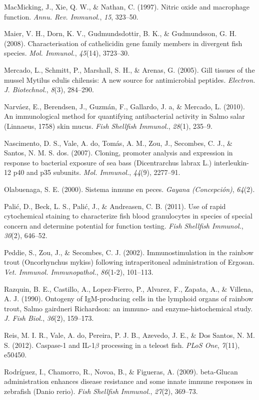 \documentclass[12pt,a4paper,]{article}
\begin{document}
MacMicking, J., Xie, Q. W., \& Nathan, C. (1997). Nitric oxide and
macrophage function. \emph{Annu. Rev. Immunol.}, \emph{15}, 323--50.

Maier, V. H., Dorn, K. V., Gudmundsdottir, B. K., \& Gudmundsson, G. H.
(2008). Characterisation of cathelicidin gene family members in
divergent fish species. \emph{Mol. Immunol.}, \emph{45}(14), 3723--30.

Mercado, L., Schmitt, P., Marshall, S. H., \& Arenas, G. (2005). Gill
tissues of the mussel Mytilus edulis chilensis: A new source for
antimicrobial peptides. \emph{Electron. J. Biotechnol.}, \emph{8}(3),
284--290.

Narváez, E., Berendsen, J., Guzmán, F., Gallardo, J. a, \& Mercado, L.
(2010). An immunological method for quantifying antibacterial activity
in Salmo salar (Linnaeus, 1758) skin mucus. \emph{Fish Shellfish
Immunol.}, \emph{28}(1), 235--9.

Nascimento, D. S., Vale, A. do, Tomás, A. M., Zou, J., Secombes, C. J.,
\& Santos, N. M. S. dos. (2007). Cloning, promoter analysis and
expression in response to bacterial exposure of sea bass (Dicentrarchus
labrax L.) interleukin-12 p40 and p35 subunits. \emph{Mol. Immunol.},
\emph{44}(9), 2277--91.

Olabuenaga, S. E. (2000). Sistema inmune en peces. \emph{Gayana
(Concepción)}, \emph{64}(2).

Palić, D., Beck, L. S., Palić, J., \& Andreasen, C. B. (2011). Use of
rapid cytochemical staining to characterize fish blood granulocytes in
species of special concern and determine potential for function testing.
\emph{Fish Shellfish Immunol.}, \emph{30}(2), 646--52.

Peddie, S., Zou, J., \& Secombes, C. J. (2002). Immunostimulation in the
rainbow trout (Oncorhynchus mykiss) following intraperitoneal
administration of Ergosan. \emph{Vet. Immunol. Immunopathol.},
\emph{86}(1-2), 101--113.

Razquin, B. E., Castillo, A., Lopez-Fierro, P., Alvarez, F., Zapata, A.,
\& Villena, A. J. (1990). Ontogeny of IgM-producing cells in the
lymphoid organs of rainbow trout, Salmo gairdneri Richardson: an immuno-
and enzyme-histochemical study. \emph{J. Fish Biol.}, \emph{36}(2),
159--173.

Reis, M. I. R., Vale, A. do, Pereira, P. J. B., Azevedo, J. E., \& {Dos
Santos}, N. M. S. (2012). Caspase-1 and IL-1$\beta$ processing in a
teleost fish. \emph{PLoS One}, \emph{7}(11), e50450.

Rodríguez, I., Chamorro, R., Novoa, B., \& Figueras, A. (2009).
beta-Glucan administration enhances disease resistance and some innate
immune responses in zebrafish (Danio rerio). \emph{Fish Shellfish
Immunol.}, \emph{27}(2), 369--73.
\end{document}
